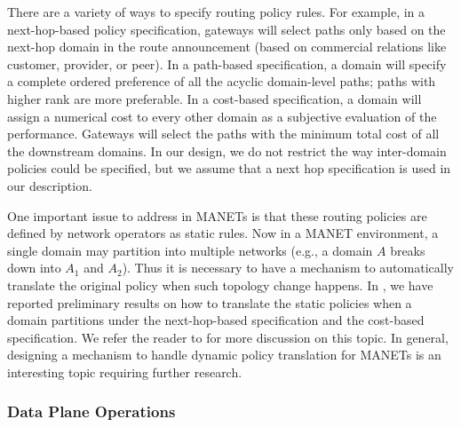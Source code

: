 There are a variety of ways to specify routing policy rules. For example, in a next-hop-based policy specification, gateways will select paths only based on the next-hop domain in the route announcement (based on commercial relations like customer, provider, or peer). In a path-based specification, a domain will specify a complete ordered preference of all the acyclic domain-level paths; paths with higher rank are more preferable. In a cost-based specification, a domain will assign a numerical cost to every other domain as a subjective evaluation of the performance. Gateways will select the paths with the minimum total cost of all the downstream domains. In our design, we do not restrict the way inter-domain policies could be specified, but we assume that a next hop specification is used in our description.

One important issue to address in MANETs is that these routing policies are defined by network operators as static rules. Now in a MANET environment, a single domain may partition into multiple networks (e.g., a domain $A$ breaks down into $A_1$ and $A_2$). Thus it is necessary to have a mechanism to automatically translate the original policy when such topology change happens. In \cite{policy08}, we have reported preliminary results on how to translate the static policies when a domain partitions under the next-hop-based specification and the cost-based specification. We refer the reader to \cite{policy08} for more discussion on this topic. In general, designing a mechanism to handle dynamic policy translation for MANETs is an interesting topic requiring further research.

\subsubsection{Data Plane Operations} 


%

